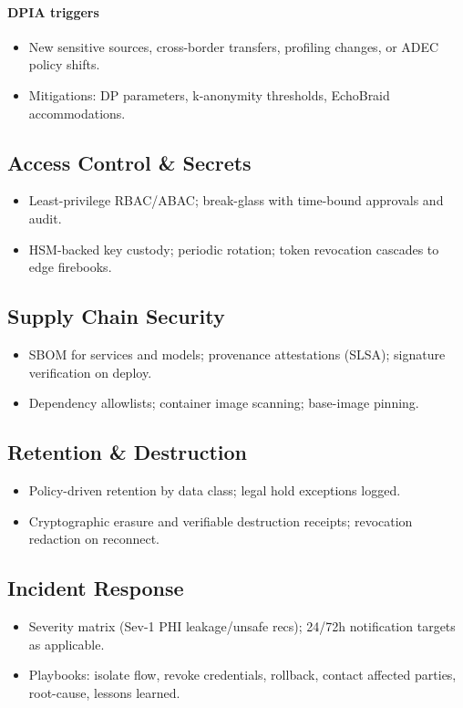 \documentclass[11pt]{article}
\theoremstyle{plain}
\begin{document}
\paragraph{DPIA triggers}
\begin{itemize}
  \item New sensitive sources, cross-border transfers, profiling changes, or ADEC policy shifts.
  \item Mitigations: DP parameters, k-anonymity thresholds, EchoBraid accommodations.
\end{itemize}

\subsection{Access Control \& Secrets}
\begin{itemize}
  \item Least-privilege RBAC/ABAC; break-glass with time-bound approvals and audit.
  \item HSM-backed key custody; periodic rotation; token revocation cascades to edge firebooks.
\end{itemize}

\subsection{Supply Chain Security}
\begin{itemize}
  \item SBOM for services and models; provenance attestations (SLSA); signature verification on deploy.
  \item Dependency allowlists; container image scanning; base-image pinning.
\end{itemize}

\subsection*{Retention \& Destruction}
\begin{itemize}
  \item Policy-driven retention by data class; legal hold exceptions logged.
  \item Cryptographic erasure and verifiable destruction receipts; revocation redaction on reconnect.
\end{itemize}

\subsection{Incident Response}
\begin{itemize}
  \item Severity matrix (Sev-1 PHI leakage/unsafe recs); 24/72h notification targets as applicable.
  \item Playbooks: isolate flow, revoke credentials, rollback, contact affected parties, root-cause, lessons learned.
\end{itemize}
\end{document}
